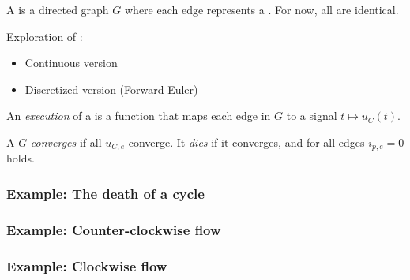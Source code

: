 \documentclass[	hyperref={pdfpagelabels=false}, xcolor=dvipsnames,
		11pt]{beamer}
\begin{document}
\begin{frame}
    \frametitle{\Pns}

    A \Pn is a directed graph $G$ where each edge represents a \Pe. For now, all \Pes are identical.

    \begin{alertblock}{Exploration of \Pns:}

    	\begin{itemize}
    		\item Continuous version
    		\item Discretized version (Forward-Euler)
    	\end{itemize}

    \end{alertblock}

    An \emph{execution} of a \Pn is a function that maps each edge in $G$ to a signal $t \mapsto u_C(t)$.

    A \Pn $G$ \emph{converges} if all $u_{C,e}$ converge. It \emph{dies} if it converges, and for all edges $i_{p,e} = 0$ holds.
\end{frame}

\begin{frame}
	\frametitle{Example: The death of a cycle}
		\begin{figure}
			\centering
			\captionsetup[subfloat]{position=bottom,labelformat=empty,font=scriptsize}
		\end{figure}
\end{frame}
\begin{frame}[noframenumbering]
	\frametitle{Example: Counter-clockwise flow}
		\begin{figure}
			\centering
			\captionsetup[subfloat]{position=bottom,labelformat=empty,font=scriptsize}
		\end{figure}
\end{frame}
\begin{frame}[noframenumbering]
	\frametitle{Example: Clockwise flow}
		\begin{figure}
			\centering
			\captionsetup[subfloat]{position=bottom,labelformat=empty,font=scriptsize}
		\end{figure}
\end{frame}
\end{document}

